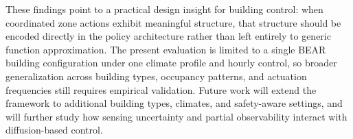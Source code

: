 \documentclass[conference]{IEEEtran}
\theoremstyle{nonumberplain}
\theoremstyle{plain}
\begin{document}
These findings point to a practical design insight for building control: when coordinated zone actions exhibit meaningful structure, that structure should be encoded directly in the policy architecture rather than left entirely to generic function approximation. The present evaluation is limited to a single BEAR building configuration under one climate profile and hourly control, so broader generalization across building types, occupancy patterns, and actuation frequencies still requires empirical validation. Future work will extend the framework to additional building types, climates, and safety-aware settings, and will further study how sensing uncertainty and partial observability interact with diffusion-based control.

\balance


\end{document}
